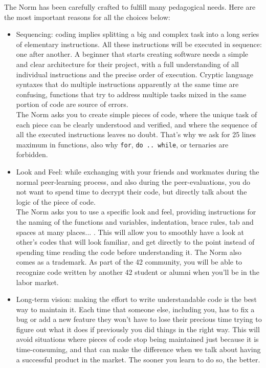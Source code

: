 \documentclass{42-en}
\begin{document}
    The Norm has been carefully crafted to fulfill many pedagogical needs. Here
    are the most important reasons for all the choices below:
    \begin{itemize}

    \item Sequencing: coding implies splitting a big and complex task into a long series
      of elementary instructions. All these instructions will be executed in sequence:
      one after another. A beginner that starts creating software needs a simple and clear
      architecture for their project, with a full understanding of all individual instructions
      and the precise order of execution. Cryptic language syntaxes that do multiple
      instructions apparently at the same time are confusing, functions that try to address
      multiple tasks mixed in the same portion of code are source of errors.\\
      The Norm asks you to create simple pieces of code, where the unique task of each piece
      can be clearly understood and verified, and where the sequence of all the executed
      instructions leaves no doubt. That's why we ask for 25 lines maximum in functions, also why
      \texttt{for}, \texttt{do .. while}, or ternaries are forbidden.

    \item Look and Feel: while exchanging with your friends and workmates during the
      normal peer-learning process, and also during the peer-evaluations, you do not
      want to spend time to decrypt their code, but directly talk about the
      logic of the piece of code.\\
      The Norm asks you to use a specific look and feel, providing instructions for the naming
      of the functions and variables, indentation, brace rules, tab and spaces at many places... .
      This will allow you to smoothly have a look at other's codes that will look familiar,
      and get directly to the point instead of spending time reading the code before understanding it.
      The Norm also comes as a trademark. As part of the 42 community, you will be able to
      recognize code written by another 42 student or alumni when you'll be in the labor market.

    \item Long-term vision: making the effort to write understandable code is the
      best way to maintain it. Each time that someone else, including you, has to fix a bug
      or add a new feature they won't have to lose their precious time trying to figure out
      what it does if previously you did things in the right way. This will avoid situations
      where pieces of code stop being maintained just because it is time-consuming, and that
      can make the difference when we talk about having a successful product in the market.
      The sooner you learn to do so, the better.


\end{itemize}
\end{document}
